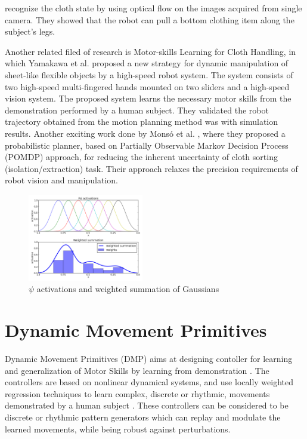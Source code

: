\documentclass[sigconf]{acmart}
\begin{document}
recognize the cloth state by using  optical flow on the images acquired from single camera. They showed that the robot can pull a bottom clothing item along the subject's legs.

Another related filed of research is Motor-skills Learning for Cloth Handling, in which Yamakawa et al. \cite{yamakawa2011dynamic} proposed a new strategy for dynamic manipulation of sheet-like flexible objects by a high-speed robot system. The system consists of two high-speed multi-fingered hands mounted on two sliders and a high-speed vision system. The proposed system learns the necessary motor skills from the demonstration performed by a human subject. They validated the robot trajectory obtained from the motion planning method was with simulation results. Another exciting work done by Mons{\'o} et al. \cite{monso2012pomdp}, where they proposed a probabilistic planner, based on Partially Observable Markov Decision Process (POMDP) approach, for reducing the inherent uncertainty of cloth sorting (isolation/extraction) task. Their approach relaxes the precision requirements of robot vision and manipulation.

\begin{figure}
	\includegraphics[width=0.45\textwidth]{psi}
	\caption{$\psi$ activations and weighted summation of Gaussians}
	\label{psi_activations}
\end{figure}

\section{Dynamic Movement Primitives}
\label{dmp}
Dynamic Movement Primitives (DMP) aims at designing contoller for learning and generalization of Motor Skills by learning from demonstration \cite{ijspeert2003learning}. The controllers are based on nonlinear dynamical systems, and use locally weighted regression techniques to learn complex, discrete or rhythmic, movements demonstrated by a human subject \cite{ijspeert2002movement}. These controllers can be considered to be discrete or rhythmic pattern generators which can replay and modulate the learned movements, while being robust against perturbations. 
\end{document}
